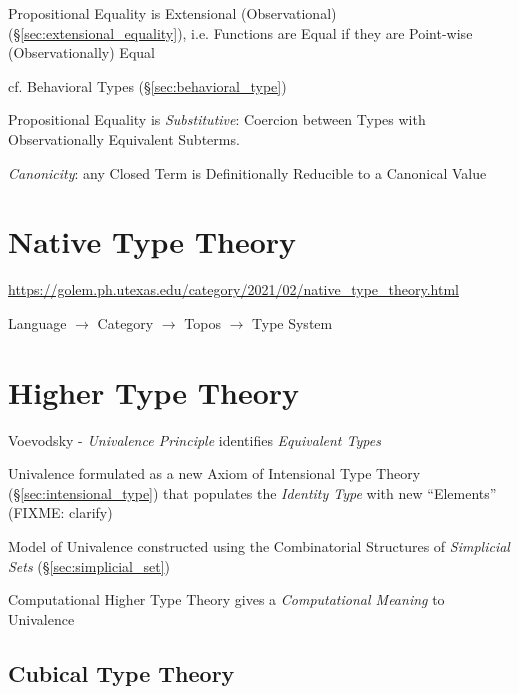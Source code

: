 Propositional Equality is Extensional (Observational)
(\S\ref{sec:extensional_equality}), i.e. Functions are Equal if they
are Point-wise (Observationally) Equal

cf. Behavioral Types (\S\ref{sec:behavioral_type})

Propositional Equality is \emph{Substitutive}: Coercion between Types
with Observationally Equivalent Subterms.

\emph{Canonicity}: any Closed Term is Definitionally Reducible to a
Canonical Value



\section{Native Type Theory}\label{sec:native_type_theory}

\url{https://golem.ph.utexas.edu/category/2021/02/native_type_theory.html}

Language $\rightarrow$ Category $\rightarrow$ Topos $\rightarrow$ Type System



\section{Higher Type Theory}\label{sec:higher_type_theory}

Voevodsky - \emph{Univalence Principle} identifies \emph{Equivalent Types}

Univalence formulated as a new Axiom of Intensional Type Theory
(\S\ref{sec:intensional_type}) that populates the \emph{Identity Type} with new
``Elements'' (FIXME: clarify)

Model of Univalence constructed using the Combinatorial Structures of
\emph{Simplicial Sets} (\S\ref{sec:simplicial_set})

Computational Higher Type Theory gives a \emph{Computational Meaning} to
Univalence



\subsection{Cubical Type Theory}\label{sec:cubical_type_theory}

